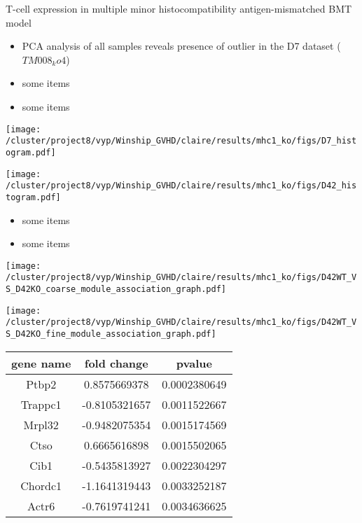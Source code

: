 \documentclass[final,hyperref={pdfpagelabels=false}]{beamer}
\begin{document}
\begin{frame}{}
\begin{columns}[t]
\begin{column}{.24\linewidth}
\begin{block}{T-cell expression in multiple minor histocompatibility antigen-mismatched BMT model}
          \begin{itemize}
          \item PCA analysis of all samples reveals presence of outlier in the D7 dataset ($TM008_ko4$)
          \item some items
          \item some items
          \end{itemize}
	  \begin{minipage}{0.45\textwidth}
            \texttt{[image: /cluster/project8/vyp/Winship\_GVHD/claire/results/mhc1\_ko/figs/D7\_histogram.pdf]}
          \end{minipage}
	  \begin{minipage}{0.45\textwidth}
            \texttt{[image: /cluster/project8/vyp/Winship\_GVHD/claire/results/mhc1\_ko/figs/D42\_histogram.pdf]}
          \end{minipage}
	  \begin{itemize}
	    \item some items
	    \item some items
	    \end{itemize}
          \begin{minipage}{0.45\textwidth}
            \texttt{[image: /cluster/project8/vyp/Winship\_GVHD/claire/results/mhc1\_ko/figs/D42WT\_VS\_D42KO\_coarse\_module\_association\_graph.pdf]}
          \end{minipage}
          \begin{minipage}{0.45\textwidth}
            \texttt{[image: /cluster/project8/vyp/Winship\_GVHD/claire/results/mhc1\_ko/figs/D42WT\_VS\_D42KO\_fine\_module\_association\_graph.pdf]}
          \end{minipage}
	  \begin{center}
	    \begin{tabular}{ |c|c|c| } 
	      \hline
	      gene name & fold change & pvalue \\
	      \hline
	      Ptbp2 & 0.8575669378 & 0.0002380649 \\
	      Trappc1 & -0.8105321657 & 0.0011522667 \\
	      Mrpl32 & -0.9482075354 & 0.0015174569 \\
	      Ctso & 0.6665616898 & 0.0015502065 \\
	      Cib1 & -0.5435813927 & 0.0022304297 \\
	      Chordc1  & -1.1641319443 & 0.0033252187 \\
	      Actr6 & -0.7619741241 & 0.0034636625 \\

\end{tabular}
\end{center}
\end{block}
\end{column}
\end{columns}
\end{frame}
\end{document}
